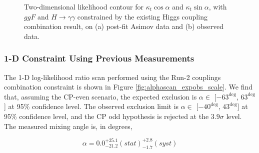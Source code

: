 \begin{figure}[htbp]
  \centering
  \caption{Two-dimensional likelihood contour for $\kappa_t \cos\alpha$ and $\kappa_t \sin\alpha$, with $ggF$ and $H \rightarrow \gamma\gamma$ constrained by the existing Higgs coupling combination result, on (a) post-fit Asimov data and (b) observed data.
  \label{fig:s2:contours}}
\end{figure}

\subsubsection{1-D Constraint Using Previous Measurements}

The 1-D log-likelihood ratio scan performed using the Run-2 couplings combination constraint is shown in Figure \ref{fig:alphascan_expobs_scale}. We find that, assuming the CP-even scenario, the expected exclusion is $\alpha \in$ [$-63^{\deg}$, $63^{\deg}$] at 95\% confidence level. The observed exclusion limit is  $\alpha \in$ [$-40^{\deg}$, $43^{\deg}$] at 95\% confidence level, and the CP odd hypothesis is rejected at the $3.9\sigma$ level. The measured mixing angle is, in degrees, 

\begin{equation}
\alpha = 0.0^{+25.1}_{-21.2}(stat)^{+2.8}_{-1.7}(syst)
\end{equation}

